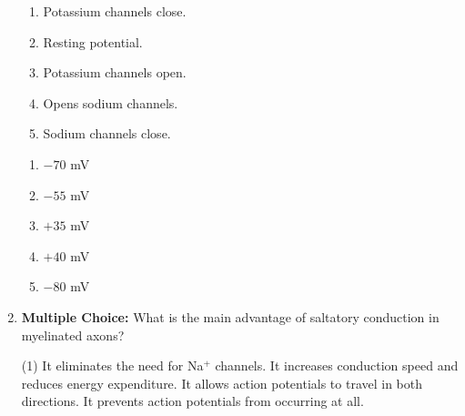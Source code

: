 \begin{enumerate}[label=\textbf{Q2.3.\arabic*}]
\begin{tikzpicture}[scale=1.2]

            \end{tikzpicture}


            \begin{wordbox}
                  \begin{enumerate}[label=(\alph*)]
                        \item Potassium channels close.
                        \item Resting potential.
                        \item Potassium channels open.
                        \item Opens sodium channels.
                        \item Sodium channels close.
                  \end{enumerate}
            \end{wordbox}
            \begin{enumerate}[label=(\arabic*)]
                  \item \(-70\) mV \quad \dotfill \quad \underline{\hspace{1cm}}\\
                  \item \(-55\) mV \quad \dotfill \quad \underline{\hspace{1cm}}\\
                  \item \(+35\) mV \quad \dotfill \quad \underline{\hspace{1cm}}\\
                  \item \(+40\) mV \quad \dotfill \quad \underline{\hspace{1cm}}\\
                  \item \(-80\) mV \quad \dotfill \quad \underline{\hspace{1cm}}
            \end{enumerate}

\newpage
      



            \item \textbf{Multiple Choice:} What is the main advantage of saltatory conduction in myelinated axons?
            \begin{tasks}[label=(\Alph*), label-width=1.5em, item-indent=1.7em](1)
                  \task It eliminates the need for Na\(^+\) channels.
                  \task It increases conduction speed and reduces energy expenditure.
                  \task It allows action potentials to travel in both directions.
                  \task It prevents action potentials from occurring at all.
            \end{tasks}
            

\end{enumerate}
